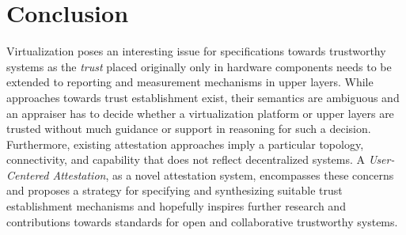 \section{Conclusion}\label{conclusion}
Virtualization poses an interesting issue for specifications towards trustworthy systems as the \emph{trust} placed originally only in hardware components needs to be extended to reporting and measurement mechanisms in upper layers. While approaches towards trust establishment exist, their semantics are ambiguous and an appraiser has to decide whether a virtualization platform or upper layers are trusted without much guidance or support in reasoning for such a decision. Furthermore, existing attestation approaches imply a particular topology, connectivity, and capability that does not reflect decentralized systems. A \emph{User-Centered Attestation}, as a novel attestation system, encompasses these concerns and proposes a strategy for specifying and synthesizing suitable trust establishment mechanisms and hopefully inspires further research and contributions towards standards for open and collaborative trustworthy systems. 
